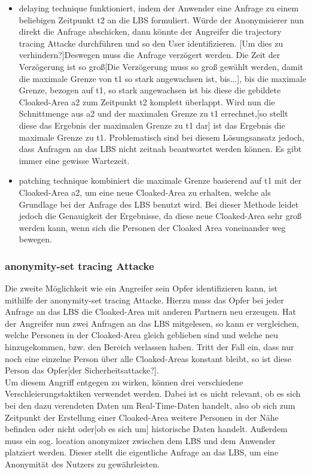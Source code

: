 \begin{itemize} 
\item{delaying technique} funktioniert, indem der Anwender eine Anfrage zu einem beliebigen Zeitpunkt t2 an die LBS formuliert. Würde der Anonymisierer nun direkt die Anfrage abschicken, dann könnte der Angreifer die trajectory tracing Attacke durchführen und so den User identifizieren. [Um dies zu verhindern?]Deswegen muss die Anfrage verzögert werden. Die Zeit der Verzögerung ist so groß[Die Verzögerung muss so groß gewählt werden, damit die maximale Grenze von t1 so stark angewachsen ist, bis...], bis die maximale Grenze, bezogen auf t1, so stark angewachsen ist bis diese die gebildete Cloaked-Area a2 zum Zeitpunkt t2 komplett überlappt. Wird nun die Schnittmenge aus a2 und der maximalen Grenze zu t1 errechnet,[so stellt diese das Ergebnis der maximalen Grenze zu t1 dar] ist das Ergebnis die maximale Grenze zu t1. Problematisch sind bei diesem Lösungsansatz jedoch, dass Anfragen an das LBS nicht zeitnah beantwortet werden können. Es gibt immer eine gewisse Wartezeit. \item{patching technique} kombiniert die maximale Grenze basierend auf t1 mit der Cloaked-Area a2, um eine neue Cloaked-Area zu erhalten, welche als Grundlage bei der Anfrage des LBS benutzt wird. Bei dieser Methode leidet jedoch die Genauigkeit der Ergebnisse, da diese neue Cloaked-Area sehr groß werden kann, wenn sich die Personen der Cloaked Area voneinander weg bewegen.  
\end{itemize} 
\subsubsection{anonymity-set tracing Attacke} 
Die zweite Möglichkeit wie ein Angreifer sein Opfer identifizieren kann, ist mithilfe der anonymity-set tracing Attacke. Hierzu muss das Opfer bei jeder Anfrage an das LBS die Cloaked-Area mit anderen Partnern neu erzeugen. Hat der Angreifer nun zwei Anfragen an das LBS mitgelesen, so kann er vergleichen, welche Personen in der Cloaked-Area gleich geblieben sind und welche neu hinzugekommen, bzw. den Bereich verlassen haben. Tritt der Fall ein, dass nur noch eine einzelne Person über alle Cloaked-Areas konstant bleibt, so ist diese Person das Opfer[der Sicherheitsattacke?].\\ Um diesem Angriff entgegen zu wirken, können drei verschiedene Verschleierungstaktiken verwendet werden. Dabei ist es nicht relevant, ob es sich bei den dazu verendeten Daten um Real-Time-Daten handelt, also ob sich zum Zeitpunkt der Erstellung einer Cloaked-Area weitere Personen in der Nähe befinden oder nicht oder[ob es sich um] historische Daten handelt. Außerdem muss ein sog. location anonymizer zwischen dem LBS und dem Anwender platziert werden. Dieser stellt die eigentliche Anfrage an das LBS, um eine Anonymität des Nutzers zu gewährleisten. 
